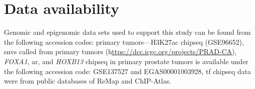 \section{Data availability}

Genomic and epigenomic data sets used to support this study can be found from the following accession codes: primary tumors—H3K27ac \gls{chipseq} (GSE96652), \glspl{snv} called from primary tumors (h\url{ttps://dcc.icgc.org/projects/PRAD-CA}), \emph{FOXA1}, \gls{ar}, and \emph{HOXB13} \gls{chipseq} in primary prostate tumors is available under the following accession code: GSE137527 and EGAS00001003928, \gls{tf} \gls{chipseq} data were from public databases of ReMap and ChIP-Atlas.
